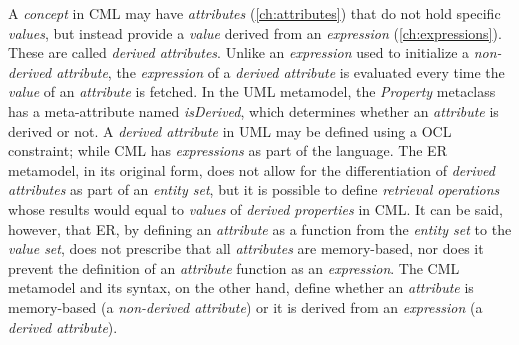 \begin{definition}
A \emph{concept} in CML may have \emph{attributes} (\ref{ch:attributes})
that do not hold specific \emph{values},
but instead provide a \emph{value} derived from an \emph{expression} (\ref{ch:expressions}).
These are called \emph{derived attributes}.
Unlike an \emph{expression} used to initialize a \emph{non-derived attribute},
the \emph{expression} of a \emph{derived attribute} is evaluated
every time the \emph{value} of an \emph{attribute} is fetched.
In the UML \cite{uml} metamodel,
the \emph{Property} metaclass has a meta-attribute named \emph{isDerived},
which determines whether an \emph{attribute} is derived or not.
A \emph{derived attribute} in UML may be defined using a OCL \cite{ocl} constraint;
while CML has \emph{expressions} as part of the language.
The ER \cite{er} metamodel,
in its original form,
does not allow for the differentiation of \emph{derived attributes}
as part of an \emph{entity set},
but it is possible to define \emph{retrieval operations} whose 
results would equal to \emph{values} of \emph{derived properties} in CML.
It can be said, however, that ER,
by defining an \emph{attribute} as a function from the \emph{entity set}
to the \emph{value set},
does not prescribe that all \emph{attributes} are memory-based,
nor does it prevent the definition of an \emph{attribute} function 
as an \emph{expression}.
The CML metamodel and its syntax, on the other hand,
define whether an \emph{attribute} is memory-based (a \emph{non-derived attribute})
or it is derived from an \emph{expression} (a \emph{derived attribute}).
\end{definition}

